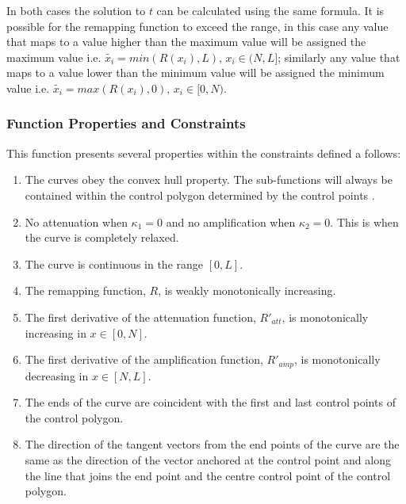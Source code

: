 \documentclass[a4paper,11pt]{ijamas}
\begin{document}
In both cases the solution to $t$ can be calculated using the same formula.
It is possible for the remapping function to exceed the range, in this case any value that maps to a value higher than the maximum value will be assigned the maximum value i.e. $\widetilde{x_i} = min(R(x_i),L), \,  x_i \in (N,L]$; similarly any value that maps to a value lower than the minimum value will be assigned the minimum value i.e. $\widetilde{x_i} = max(R(x_i),0), \, x_i \in [0,N)$.

\subsubsection{Function Properties and Constraints}
This function presents several properties within the constraints defined a follows:
\begin{enumerate}
\item
The curves obey the convex hull property. The sub-functions will always be contained within the control polygon determined by the control points \cite{jvince:2006,dmarsh:2005}.

\item
No attenuation when $\kappa_1=0$ and no amplification when $\kappa_2=0$. This is when the curve is completely relaxed.

\item
The curve is continuous in the range $[0,L]$.

\item
The remapping function, $R$, is weakly monotonically increasing.

\item
The first derivative of the attenuation function, $R'_{att}$, is monotonically increasing in $x \in [0, N]$.

\item
The first derivative of the amplification function, $R'_{amp}$, is monotonically decreasing in $x \in [N, L]$.

\item
The ends of the curve are coincident with the first and last control points of the control polygon.

\item
The direction of the tangent vectors from the end points of the curve are the same as the direction of the vector anchored at the control point and along the line that joins the end point and the centre control point of the control polygon.
\end{enumerate}
\end{document}
